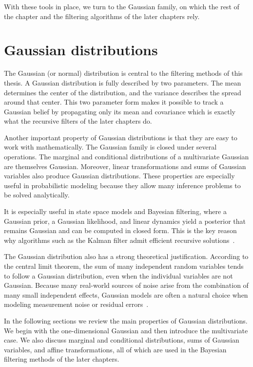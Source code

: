 With these tools in place, we turn to the Gaussian family, on which the rest of the chapter and the filtering algorithms of the later chapters rely.

\section{Gaussian distributions}
The Gaussian (or normal) distribution is central to the filtering methods of this thesis. A Gaussian distribution is fully described by two parameters. The mean determines the center of the distribution, and the variance describes the spread around that center. This two parameter form makes it possible to track a Gaussian belief by propagating only its mean and covariance which is exactly what the recursive filters of the later chapters do. 

Another important property of Gaussian distributions is that they are easy to work with mathematically. The Gaussian family is closed under several operations. The marginal and conditional distributions of a multivariate Gaussian are themselves Gaussian. Moreover, linear transformations and sums of Gaussian variables also produce Gaussian distributions. These properties are especially useful in probabilistic modeling because they allow many inference problems to be solved analytically. 

It is especially useful in state space models and Bayesian filtering, where a Gaussian prior, a Gaussian likelihood, and linear dynamics yield a posterior that remains Gaussian and can be computed in closed form. This is the key reason why algorithms such as the Kalman filter admit efficient recursive solutions~\cite[Ch.~3]{murphy:probabilistic_ml_introduction}.

The Gaussian distribution also has a strong theoretical justification. According to the central limit theorem, the sum of many independent random variables tends to follow a Gaussian distribution, even when the individual variables are not Gaussian. Because many real-world sources of noise arise from the combination of many small independent effects, Gaussian models are often a natural choice when modeling measurement noise or residual errors~\cite[Ch.~2]{murphy:probabilistic_ml_introduction}.

In the following sections we review the main properties of Gaussian distributions. We begin with the one-dimensional Gaussian and then introduce the multivariate case. We also discuss marginal and conditional distributions, sums of Gaussian variables, and affine transformations, all of which are used in the Bayesian filtering methods of the later chapters.

